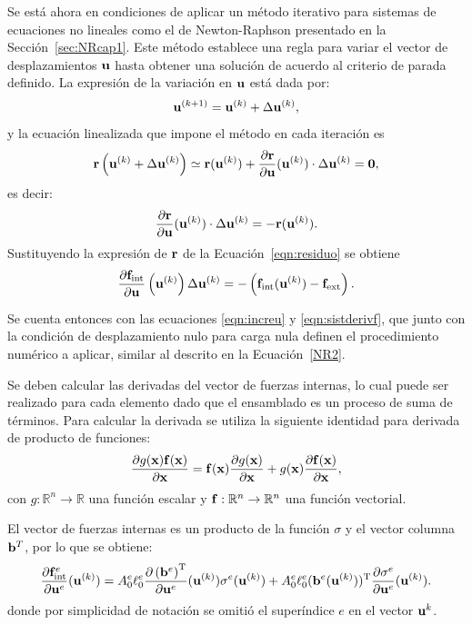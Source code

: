 Se está ahora en condiciones de aplicar un método iterativo para sistemas de ecuaciones no lineales como el de Newton-Raphson presentado en la Sección~\ref{sec:NRcap1}. %
%
Este método establece una regla para variar el vector de desplazamientos ${\bf u}$ hasta obtener una solución de acuerdo al criterio de parada definido. %
%
La expresión de la variación en ${\bf u}$ está dada por:
%
\begin{equation} \label{eqn:increu}
{\bf u}^{(k+1)} = {\bf u}^{(k)} + \Delta {\bf u}^{(k)},
\end{equation}
%
y la ecuación linealizada que impone el método en cada iteración es
%
\begin{equation}
{\bf r} \left( {\bf u}^{(k)} + \Delta {\bf u}^{(k)} \right) \simeq {\bf r}({\bf u}^{(k)} ) + \frac{\partial {\bf r}}{\partial {\bf u}}({\bf u}^{(k)})\cdot \Delta {\bf u}^{(k)} = \boldsymbol{0},
\end{equation}
%
es decir:
\begin{equation}
\frac{\partial {\bf r}}{\partial {\bf u}}({\bf u}^{(k)})\cdot \Delta {\bf u}^{(k)} = -{\bf r}({\bf u}^{(k)} ).
\end{equation}
%
Sustituyendo la expresión de ${\bf r}$ de la Ecuación~\eqref{eqn:residuo} se obtiene
%
\begin{equation}\label{eqn:sistderivf}
\frac{\partial {\bf f}_{\text{int}}}{\partial {\bf u}} \left({\bf u}^{(k)} \right)   \Delta {\bf u}^{(k)}
= - \left( {\bf f}_{\text{int}}({\bf u}^{(k)} ) - {\bf f}_{\text{ext}} \right).
\end{equation}
%

Se cuenta entonces con las ecuaciones \eqref{eqn:increu} y \eqref{eqn:sistderivf}, que junto con la condición de desplazamiento nulo para carga nula definen el procedimiento numérico a aplicar, similar al descrito en la Ecuación~\eqref{NR2}.


Se deben calcular las derivadas del vector de fuerzas internas, lo cual puede ser realizado para cada elemento dado que el ensamblado es un proceso de suma de términos. %
%
Para calcular la derivada se utiliza la siguiente identidad para derivada de producto de funciones:
$$
\dfrac{\partial g({\bf x}){\bf f}({\bf x})}{\partial {\bf x}} = {\bf f}({\bf x})\dfrac{\partial g({\bf x})}{\partial {\bf x}}+g({\bf x})\dfrac{\partial {\bf f}({\bf x})}{\partial {\bf x}},
$$
con  $g:\mathbb{R}^n\rightarrow \mathbb{R}$ una función escalar y ${\bf f}:\mathbb{R}^n\rightarrow \mathbb{R}^n$ una función vectorial. %

El vector de fuerzas internas es un producto de la función $\sigma$ y el vector columna ${\bf b}^T$, por lo que se obtiene:
%
\begin{equation}\label{eqn:fueinterna}
\frac{\partial {\bf f}^e_{\text{int}} } {\partial {\bf u}^e} ({\bf u}^{(k)}) 
= A_0^e \ell_0^e  \frac{\partial \left({\bf b}^e\right)^{\text{T}} }{\partial {\bf u}^e} ({\bf u}^{(k)}) \sigma^e({\bf u}^{(k)}) 
+ A_0^e \ell_0^e  ({\bf b}^e({\bf u}^{(k)}))^{\text{T}} \frac{ \partial \sigma^e}{\partial {\bf u}^e}({\bf u}^{(k)}).
\end{equation}
%
donde por simplicidad de notación se omitió el superíndice $e$ en el vector ${\bf u}^k$.

